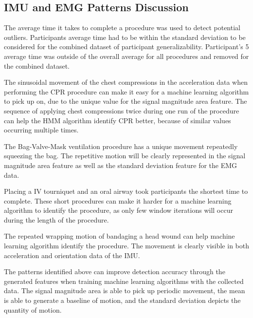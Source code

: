 \subsection{IMU and EMG Patterns Discussion}
\label{sec:Results:Patterns:Discussion}

\par The average time it takes to complete a procedure was used to detect potential outliers. Participants average time had to be within the standard deviation to be considered for the combined dataset of participant generalizability. Participant's 5 average time was outside of the overall average for all procedures and removed for the combined dataset.

\par The sinusoidal movement of the chest compressions in the acceleration data when performing the CPR procedure can make it easy for a machine learning algorithm to pick up on, due to the unique value for the signal magnitude area feature. The sequence of applying chest compressions twice during one run of the procedure can help the HMM algorithm identify CPR better, because of similar values occurring multiple times.

\par The Bag-Valve-Mask ventilation procedure has a unique movement repeatedly squeezing the bag. The repetitive motion will be clearly represented in the signal magnitude area feature as well as the standard deviation feature for the EMG data.

\par Placing a IV tourniquet and an oral airway took participants the shortest time to complete. These short procedures can make it harder for a machine learning algorithm to identify the procedure, as only few window iterations will occur during the length of the procedure.

\par The repeated wrapping motion of bandaging a head wound can help machine learning algorithm identify the procedure. The movement is clearly visible in both acceleration and orientation data of the IMU.

\par The patterns identified above can improve detection accuracy through the generated features when training machine learning algorithms with the collected data. The signal magnitude area is able to pick up periodic movement, the mean is able to generate a baseline of motion, and the standard deviation depicts the quantity of motion.


